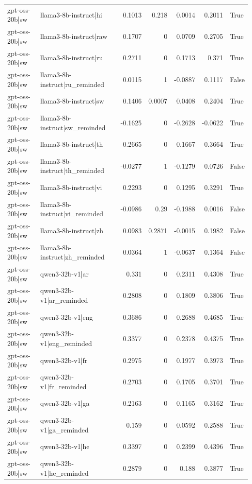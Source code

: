 \begin{table}
\begin{tabular}{l l r r r r l}
gpt-oss-20b|sw & llama3-8b-instruct|hi & 0.1013 & 0.218 & 0.0014 & 0.2011 & True \\
gpt-oss-20b|sw & llama3-8b-instruct|raw & 0.1707 & 0 & 0.0709 & 0.2705 & True \\
gpt-oss-20b|sw & llama3-8b-instruct|ru & 0.2711 & 0 & 0.1713 & 0.371 & True \\
gpt-oss-20b|sw & llama3-8b-instruct|ru_reminded & 0.0115 & 1 & -0.0887 & 0.1117 & False \\
gpt-oss-20b|sw & llama3-8b-instruct|sw & 0.1406 & 0.0007 & 0.0408 & 0.2404 & True \\
gpt-oss-20b|sw & llama3-8b-instruct|sw_reminded & -0.1625 & 0 & -0.2628 & -0.0622 & True \\
gpt-oss-20b|sw & llama3-8b-instruct|th & 0.2665 & 0 & 0.1667 & 0.3664 & True \\
gpt-oss-20b|sw & llama3-8b-instruct|th_reminded & -0.0277 & 1 & -0.1279 & 0.0726 & False \\
gpt-oss-20b|sw & llama3-8b-instruct|vi & 0.2293 & 0 & 0.1295 & 0.3291 & True \\
gpt-oss-20b|sw & llama3-8b-instruct|vi_reminded & -0.0986 & 0.29 & -0.1988 & 0.0016 & False \\
gpt-oss-20b|sw & llama3-8b-instruct|zh & 0.0983 & 0.2871 & -0.0015 & 0.1982 & False \\
gpt-oss-20b|sw & llama3-8b-instruct|zh_reminded & 0.0364 & 1 & -0.0637 & 0.1364 & False \\
gpt-oss-20b|sw & qwen3-32b-v1|ar & 0.331 & 0 & 0.2311 & 0.4308 & True \\
gpt-oss-20b|sw & qwen3-32b-v1|ar_reminded & 0.2808 & 0 & 0.1809 & 0.3806 & True \\
gpt-oss-20b|sw & qwen3-32b-v1|eng & 0.3686 & 0 & 0.2688 & 0.4685 & True \\
gpt-oss-20b|sw & qwen3-32b-v1|eng_reminded & 0.3377 & 0 & 0.2378 & 0.4375 & True \\
gpt-oss-20b|sw & qwen3-32b-v1|fr & 0.2975 & 0 & 0.1977 & 0.3973 & True \\
gpt-oss-20b|sw & qwen3-32b-v1|fr_reminded & 0.2703 & 0 & 0.1705 & 0.3701 & True \\
gpt-oss-20b|sw & qwen3-32b-v1|ga & 0.2163 & 0 & 0.1165 & 0.3162 & True \\
gpt-oss-20b|sw & qwen3-32b-v1|ga_reminded & 0.159 & 0 & 0.0592 & 0.2588 & True \\
gpt-oss-20b|sw & qwen3-32b-v1|he & 0.3397 & 0 & 0.2399 & 0.4396 & True \\
gpt-oss-20b|sw & qwen3-32b-v1|he_reminded & 0.2879 & 0 & 0.188 & 0.3877 & True \\

\end{tabular}
\end{table}
